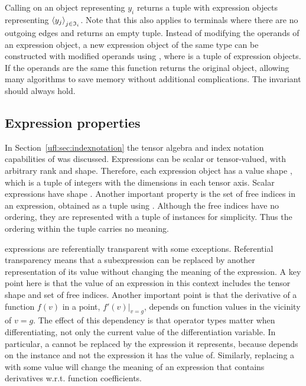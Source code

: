 Calling  on an  object 
representing $y_i$ returns a tuple with expression objects
representing $\left<y_j\right>_{j\in\mathfrak{I}_i}$.  Note that this also
applies to terminals where there are no outgoing edges and
 returns an empty tuple.  Instead of modifying the
operands of an expression object, a new expression object of the same
type can be constructed with modified operands using
, where  is a tuple of
expression objects. If the operands are the same this function returns
the original object, allowing many algorithms to save memory without
additional complications. The invariant
 should always hold.


\subsection{Expression properties}
In Section~\ref{ufl:sec:indexnotation} the tensor algebra and index
notation capabilities of \ufl{} was discussed.  Expressions can be
scalar or tensor-valued, with arbitrary rank and shape. Therefore,
each expression object  has a value shape ,
which is a tuple of integers with the dimensions in each tensor
axis. Scalar expressions have shape \icode{()}. Another important
property is the set of free indices in an expression, obtained as a
tuple using .  Although the free indices have
no ordering, they are represented with a tuple of 
instances for simplicity. Thus the ordering within the tuple carries
no meaning.

\ufl{} expressions are referentially transparent with some
exceptions. Referential transparency means that a subexpression can be
replaced by another representation of its value without changing the
meaning of the expression.  A key point here is that the value of an
expression in this context includes the tensor shape and set of free
indices.  Another important point is that the derivative of a function
$f(v)$ in a point, $f'(v)|_{v=g}$, depends on function values in the
vicinity of $v=g$.  The effect of this dependency is that operator
types matter when differentiating, not only the current value of the
differentiation variable.  In particular, a  cannot be
replaced by the expression it represents, because  depends
on the  instance and not the expression it has the
value of.  Similarly, replacing a  with some value
will change the meaning of an expression that contains derivatives
w.r.t. function coefficients.

